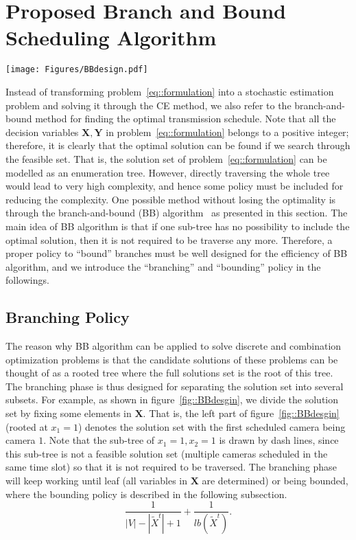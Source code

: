 \section{Proposed Branch and Bound Scheduling Algorithm}
\label{sec::bbAlgorithm}
\begin{figure*}
\begin{center}
\texttt{[image: Figures/BBdesign.pdf]}
\caption{\label{fig::BBdesgin}Enumeration tree of branch-and-bound algorithm}
\end{center}
\end{figure*}
Instead of transforming problem~\eqref{eq::formulation} into a stochastic estimation problem and solving it through the CE method, we also refer to the branch-and-bound method for finding the optimal transmission schedule.
Note that all the decision variables $\mathbf{X}, \mathbf{Y}$ in problem~\eqref{eq::formulation} belongs to a positive integer; therefore, it is clearly that the optimal solution can be found if we search through the feasible set.
That is, the solution set of problem~\eqref{eq::formulation} can be modelled as an enumeration tree.
However, directly traversing the whole tree would lead to very high complexity, and hence some policy must be included for reducing the complexity.
One possible method without losing the optimality is through the branch-and-bound (BB) algorithm~\cite{BB} as presented in this section.
The main idea of BB algorithm is that if one sub-tree has no possibility to include the optimal solution, then it is not required to be traverse any more.
Therefore, a proper policy to ``bound'' branches must be well designed for the efficiency of BB algorithm, and we introduce the ``branching'' and ``bounding'' policy in the followings.
%
\subsection{Branching Policy}
The reason why BB algorithm can be applied to solve discrete and combination optimization problems is that the candidate solutions of these problems can be thought of as a rooted tree where the full solutions set is the root of this tree.
The branching phase is thus designed for separating the solution set into several subsets.
For example, as shown in figure~\ref{fig::BBdesgin}, we divide the solution set by fixing some elements in $\mathbf{X}$.
That is, the left part of figure~\ref{fig::BBdesgin} (rooted at $x_1=1$) denotes the solution set with the first scheduled camera being camera $1$.
Note that the sub-tree of $x_1=1, x_2=1$ is drawn by dash lines, since this sub-tree is not a feasible solution set (multiple cameras scheduled in the same time slot) so that it is not required to be traversed.
The branching phase will keep working until leaf (all variables in $\mathbf{X}$ are determined) or being bounded, where the bounding policy is described in the following subsection.
\begin{equation}
\frac{1}{|V|-|\tilde{X}^t|+1}+\frac{1}{lb(\tilde{X}^t)}.
\end{equation}
%
